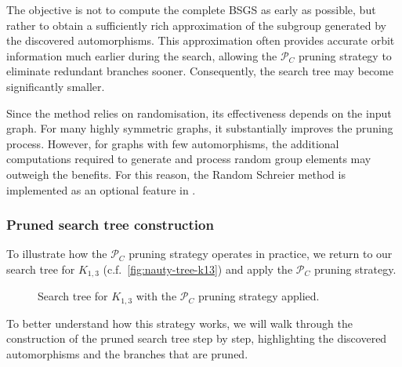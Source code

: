   The objective is not to compute the complete BSGS as early as possible, but rather to obtain a sufficiently rich approximation of the subgroup generated by the discovered automorphisms. This approximation often provides accurate orbit information much earlier during the search, allowing the $\mathcal{P}_C$ pruning strategy to eliminate redundant branches sooner. Consequently, the search tree may become significantly smaller.
  
  Since the method relies on randomisation, its effectiveness depends on the input graph. For many highly symmetric graphs, it substantially improves the pruning process. However, for graphs with few automorphisms, the additional computations required to generate and process random group elements may outweigh the benefits. For this reason, the Random Schreier method is implemented as an optional feature in \Naut{}.


  \newpage
  \subsubsection{Pruned search tree construction}

  To illustrate how the $\mathcal{P}_C$ pruning strategy operates in practice, we return to our search tree for $K_{1,3}$ (c.f.~\cref{fig:nauty-tree-k13}) and apply the $\mathcal{P}_C$ pruning strategy.
  
  \begin{figure}[htbp]
      \centering
      \resizebox{\linewidth}{!}{%
          
      }
      \caption{Search tree for $K_{1,3}$ with the $\mathcal{P}_C$ pruning strategy applied.}\label{fig:nauty-tree-k13-prunned}
  \end{figure}
  
  To better understand how this strategy works, we will walk through the construction of the pruned search tree step by step, highlighting the discovered automorphisms and the branches that are pruned.
  
